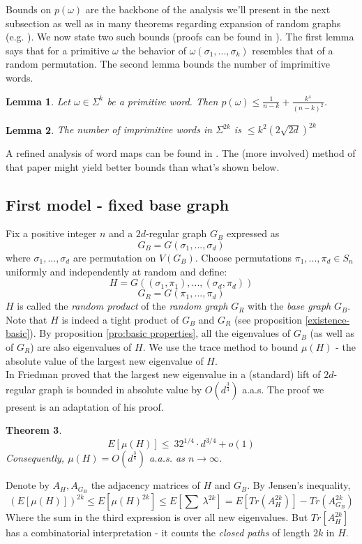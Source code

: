 \documentclass[12pt]{article}
\newtheorem{theorem}{Theorem}[section]
\newtheorem{lemma}[theorem]{Lemma}
\newtheorem{open question}[theorem]{Open question}
\newcommand{\proof}{{\par\noindent {\bf Proof}\space\space}}
\begin{document}
Bounds on $p(\omega)$ are the backbone of the analysis we'll present in the next subsection as well as in many theorems regarding expansion of random graphs (e.g. \cite{Fri03}). We now state two such bounds (proofs can be found in \cite{HLW06}). The first lemma says that
for a primitive $\omega$ the behavior of $\omega (\sigma_1,...,\sigma_k)$ resembles
that of a random permutation. The second lemma bounds the number of imprimitive words.
\begin{lemma}
Let $\omega \in \Sigma^k$ be a primitive word. Then $p(\omega)\le \frac{1}{n-k}+\frac{k^4}{(n-k)^2}$.
\end{lemma}
\begin{lemma}
The number of imprimitive words in $\Sigma^{2k}$ is  $\le k^2(2\sqrt{2d})^{2k}$
\end{lemma}
A refined analysis of word maps can be found in \cite{LP09}. The (more involved) method of that paper might yield better bounds than what's shown below.



\subsection{First model - fixed base graph}
Fix a positive integer $n$ and a $2d$-regular graph $G_B$ expressed as
$$G_B=G(\sigma_1,...,\sigma_d)$$
where $\sigma_1,...,\sigma_d$ are permutation on $V(G_B)$.
Choose permutations $\pi_1,...,\pi_d \in S_n$ uniformly and independently at random and define:
$$H=G((\sigma_1,\pi_1),...,(\sigma_d,\pi_d))$$
$$G_R=G(\pi_1,...,\pi_d)$$
$H$ is called the {\em random product} of
the {\em random graph} $G_R$ with the {\em base graph} $G_B$.
Note that $H$ is indeed a tight product of $G_B$ and $G_R$ (see proposition \ref{existence-basic}).
By proposition \ref{pro:basic properties}, all the eigenvalues of $G_B$ (as well as of $G_R$) are also eigenvalues of $H$. We use the trace method to bound $\mu(H)$ - the absolute value of the largest new eigenvalue of $H$.\\
In \cite{Fri03} Friedman proved that the largest new eigenvalue in a (standard) lift of $2d$-regular graph is bounded in absolute value by $O(d^{\frac{3}{4}})$ a.a.s. The proof we present is an adaptation of his proof.

\begin{theorem}
$$E[\mu(H)]\le\ 32^{1/4}\cdot d^{3/4}+o(1)$$
Consequently, $\mu(H)=O(d^{\frac{3}{4}})$ a.a.s. as $n\to\infty$.
\end{theorem}
\proof
Denote by $A_H,A_{G_B}$ the adjacency matrices of $H$ and $G_B$. By Jensen's inequality,
\begin{equation}\label{mu bound}
(E[\mu(H)])^{2k} \le E[\mu(H)^{2k}] \le E[\sum\ \lambda^{2k}] =E[Tr(A_H^{2k})]-Tr(A_{G_B}^{2k})
\end{equation}
Where the sum in the third expression is over
all new eigenvalues. But $Tr[A_H^{2k}]$ has a combinatorial interpretation - it counts the {\em closed paths} of length $2k$ in $H$.
\end{document}

